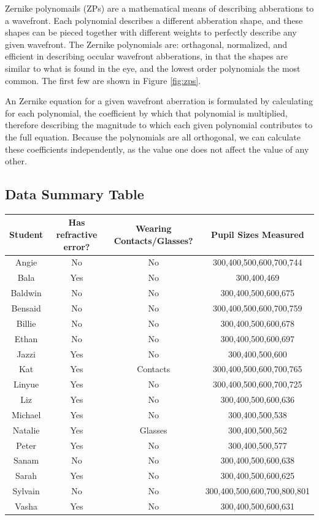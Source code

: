 \documentclass{article}
\begin{document}
Zernike polynomails (ZPs) are a mathematical means of describing abberations to a wavefront. Each polynomial describes a different abberation shape, and these shapes can be pieced together with different weights to perfectly describe any given wavefront. The Zernike polynomials are: orthagonal, normalized, and efficient in describing occular wavefront abberations, in that the shapes are similar to what is found in the eye, and the lowest order polynomials the most common. The first few are shown in Figure \ref{fig:zps}. \


An Zernike equation for a given wavefront aberration is formulated by calculating for each polynomial, the coefficient by which that polynomial is multiplied, therefore describing the magnitude to which each given polynomial contributes to the full equation. Because the polynomials are all orthogonal, we can calculate these coefficients independently, as the value one does not affect the value of any other. \

\subsection {Data Summary Table}

\begin{center}
 \begin{tabular}{||c c c c||} 
 \hline
 Student & Has refractive error? & Wearing Contacts/Glasses? & Pupil Sizes Measured\\ [0.5ex] 
 \hline\hline
 Angie & No & No & 300,400,500,600,700,744 \\ 
 \hline
 Bala & Yes & No & 300,400,469 \\ 
 \hline
 Baldwin & No & No & 300,400,500,600,675 \\ 
 \hline
 Bensaid & No & No & 300,400,500,600,700,759 \\ 
 \hline
 Billie & No & No & 300,400,500,600,678 \\ 
 \hline
 Ethan & No & No & 300,400,500,600,697 \\ 
\hline
 Jazzi & Yes & No & 300,400,500,600 \\ 
\hline
 Kat & Yes & Contacts & 300,400,500,600,700,765 \\ 
 \hline
 Linyue & Yes & No & 300,400,500,600,700,725 \\ 
 \hline
 Liz & Yes & No & 300,400,500,600,636 \\ 
 \hline
 Michael & Yes & No & 300,400,500,538 \\ 
 \hline
 Natalie & Yes & Glasses & 300,400,500,562 \\ 
 \hline
 Peter & Yes & No & 300,400,500,577 \\ 
 \hline
 Sanam & No & No & 300,400,500,600,638 \\ 
 \hline
 Sarah & Yes & No & 300,400,500,600,625 \\ 
 \hline
 Sylvain & No & No & 300,400,500,600,700,800,801 \\ 
 \hline
 Vasha & Yes & No & 300,400,500,600,631 \\ 
 \hline
 \hline
\end{tabular}
\end{center}
\end{document}
